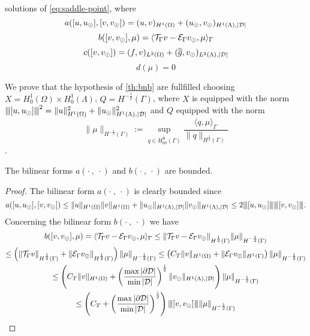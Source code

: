 solutions of \eqref{eq:saddle-point}, where
\begin{equation*}
a([u, u_{\odot}], [v, v_{\odot}])= (u,v)_{H^1(\Omega)} + (u_{\odot},v_{\odot})_{H^1(\Lambda),|\mathcal{D}|}
\end{equation*} 
\begin{equation*}
b([v, v_{\odot}], \mu)= \langle {\mathcal{T}_\Gamma} v - \mathcal{E}_\Gamma v_{\odot} , \mu \rangle_\Gamma
\end{equation*} 
\begin{equation*}
c([v,v_{\odot}])= (f,v)_{L^2(\Omega)} + (\overline{\overline{g}},v_{\odot})_{L^2(\Lambda),|\mathcal{D}|}
\end{equation*}
\begin{equation*}
d(\mu)=0
\end{equation*}

We prove that the hypothesis of \ref{th:bnb} are fullfilled choosing 
$X=H^1_0(\Omega) \times H^1_0(\Lambda)$, $Q=H^{-\frac 12}(\Gamma)$, where $X$  is equipped with the norm ${\left\vert\kern-0.25ex\left\vert\kern-0.25ex\left\vert [u,u_{\odot} ] \right\vert\kern-0.25ex\right\vert\kern-0.25ex\right\vert}^2=\|u\|^2_{H^1(\Omega)} + \|u_{\odot}\|^2_{H^1(\Lambda),|\mathcal{D}|}$ and $Q$ equipped with the norm
\begin{equation*}
\|\mu \|_{H^{-\frac 12}(\Gamma)} := \sup_{q\in H^{\frac 12}_{00}(\Gamma)}\frac{\langle q, \mu\rangle_\Gamma}{\|q\|_{H^{\frac 12}(\Gamma)}}
\end{equation*}. 
\begin{lemma}\label{lemma:prob1_boundedness} 
The bilinear forms $a(\cdot \ , \ \cdot)$ and $b(\cdot \ , \ \cdot)$ are bounded.
\end{lemma}
\begin{proof}
The bilinear form $a(\cdot \ , \ \cdot)$ is clearly bounded since
\begin{equation*}
a([u, u_{\odot}], [v, v_{\odot}])\leq \|u\|_{H^1(\Omega)}\|v\|_{H^1(\Omega)} + \|u_{\odot}\|_{H^1(\Lambda), |\mathcal{D}|}\|v_{\odot}\|_{H^1(\Lambda), |\mathcal{D}|} \leq 2 {\left\vert\kern-0.25ex\left\vert\kern-0.25ex\left\vert [u, u_{\odot}] \right\vert\kern-0.25ex\right\vert\kern-0.25ex\right\vert}{\left\vert\kern-0.25ex\left\vert\kern-0.25ex\left\vert [v, v_{\odot}] \right\vert\kern-0.25ex\right\vert\kern-0.25ex\right\vert}.
\end{equation*}
Concerning the bilinear form $b(\cdot \ , \ \cdot)$ we have
\begin{multline*}
b([v, v_{\odot}], \mu)= \langle {\mathcal{T}_\Gamma} v - \mathcal{E}_\Gamma v_{\odot} , \mu \rangle_\Gamma 
\leq \|{\mathcal{T}_\Gamma} v - \mathcal{E}_\Gamma v_{\odot}\|_{H^{\frac 12}(\Gamma)}\|\mu\|_{H^{-\frac 12}(\Gamma)}\\
\leq \left(\|{\mathcal{T}_\Gamma} v\|_{H^{\frac 12}(\Gamma)} + \|\mathcal{E}_\Gamma v_{\odot}\|_{H^{\frac 12}(\Gamma)}\right)\|\mu\|_{H^{-\frac 12}(\Gamma)}
\leq \left(C_T \|v\|_{H^1(\Omega)} + \|\mathcal{E}_\Gamma v_{\odot}\|_{H^1(\Gamma)}\right)\|\mu\|_{H^{-\frac 12}(\Gamma)}\\
\leq \left(C_T \|v\|_{H^1(\Omega)} + \left(\frac{\max |\partial\mathcal{D}|}{\min |\mathcal{D}|}\right)^{\frac 12} \|v_{\odot}\|_{H^1(\Lambda),|\mathcal{D}|}\right)\|\mu\|_{H^{-\frac 12}(\Gamma)}\\
\leq \left( C_T + \left(\frac{\max |\partial\mathcal{D}|}{\min |\mathcal{D}|}\right)^{\frac 12}\right) {\left\vert\kern-0.25ex\left\vert\kern-0.25ex\left\vert [v,v_{\odot}] \right\vert\kern-0.25ex\right\vert\kern-0.25ex\right\vert}\|\mu\|_{H^{-\frac 12}(\Gamma)}
\end{multline*}
\end{proof}

